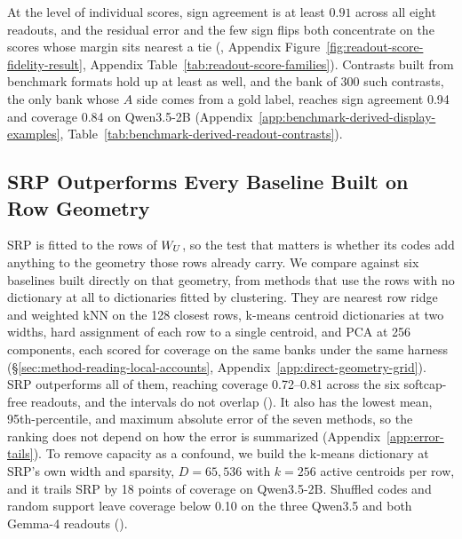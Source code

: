 At the level of individual scores, sign agreement is at least \(0.91\)
across all eight readouts, and the residual error and the few sign flips both
concentrate on the scores whose margin sits nearest a tie
(, Appendix
Figure~\ref{fig:readout-score-fidelity-result}, Appendix
Table~\ref{tab:readout-score-families}).
Contrasts built from benchmark formats hold up at least as well, and the
bank of 300 such contrasts, the only bank whose \(A\) side comes from a
gold label, reaches sign agreement 0.94 and coverage 0.84
on Qwen3.5-2B
\citep{rajpurkar2018squad2,yang2018hotpotqa,koreeda2021contractnli,guha2023legalbench,siddiq2022securityeval}
(Appendix~\ref{app:benchmark-derived-display-examples},
Table~\ref{tab:benchmark-derived-readout-contrasts}).

\subsection{SRP Outperforms Every Baseline Built on Row Geometry}\label{subsec:baseline-comparisons}
SRP is fitted to the rows of \(W_U\), so the test that matters is whether
its codes add anything to the geometry those rows already carry. We
compare against six baselines built directly on that geometry, from
methods that use the rows with no dictionary at all to dictionaries
fitted by clustering. They are nearest row ridge and
weighted kNN on the 128 closest rows, k-means centroid dictionaries
at two widths, hard assignment of each row to a single centroid, and PCA
at 256 components, each scored for coverage on the same banks under the
same harness (\S\ref{sec:method-reading-local-accounts},
Appendix~\ref{app:direct-geometry-grid}). SRP
outperforms all of them, reaching coverage 0.72--0.81 across the six
softcap-free readouts, and the intervals do not overlap
(). It also has the lowest mean,
95th-percentile, and maximum absolute error of the seven methods, so the
ranking does not depend on how the error is summarized
(Appendix~\ref{app:error-tails}). To remove capacity as a confound, we build the
k-means dictionary at SRP's own width and sparsity, \(D{=}65{,}536\) with
\(k{=}256\) active centroids per row, and it trails SRP by 18 points of
coverage on Qwen3.5-2B. Shuffled codes and
random support leave coverage below 0.10 on the three Qwen3.5 and both
Gemma-4 readouts ().

